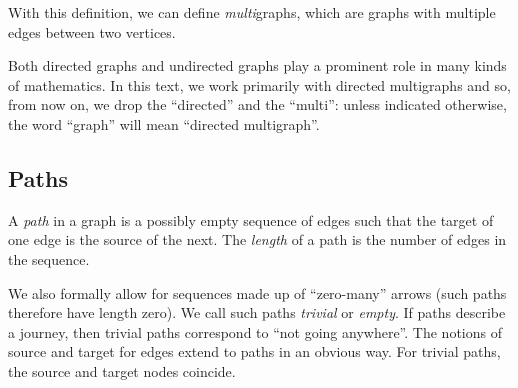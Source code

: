 With this definition, we can define \emph{multi}graphs, which are graphs with multiple edges between two vertices.


\begin{remark}
    Both directed graphs and undirected graphs play a prominent role in many kinds of mathematics.
    In this text, we work primarily with directed multigraphs and so, from now on, we drop the ``directed'' and the ``multi'': unless indicated otherwise, the word ``graph'' will mean ``directed multigraph''.

\end{remark}


\subsection{Paths}

\begin{definition}[Paths]
    \label{def:path}
    A \emph{path} in a graph is a possibly empty sequence of edges such that the target of one edge is the source of the next.
    The \emph{length} of a path is the number of edges in the sequence.
\end{definition}

We also formally allow for sequences made up of ``zero-many'' arrows (such paths therefore have length zero).
We call such paths \emph{trivial} or \emph{empty}.
If paths describe a journey, then trivial paths correspond to ``not going anywhere''.
The notions of source and target for edges extend to paths in an obvious way.
For trivial paths, the source and target nodes coincide.
